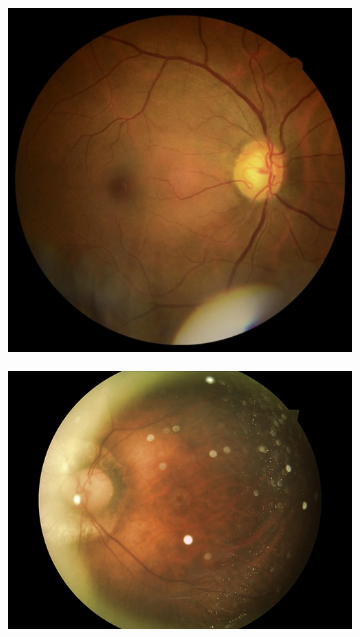 \documentclass[12pt]{article}
\begin{document}
\begin{figure}
    \centering
    \begin{subfigure}[b]{0.2\textwidth}
        \centering
        \includegraphics[width=\textwidth]{images/examples_from_dataset/TRAIN025848.JPG}
        \label{fig:images_variations_2_1}
    \end{subfigure}
    \hfill
    \begin{subfigure}[b]{0.2\textwidth}
        \centering
        \includegraphics[width=\textwidth]{images/examples_from_dataset/TRAIN045963.JPG}

\end{subfigure}
\end{figure}
\end{document}
